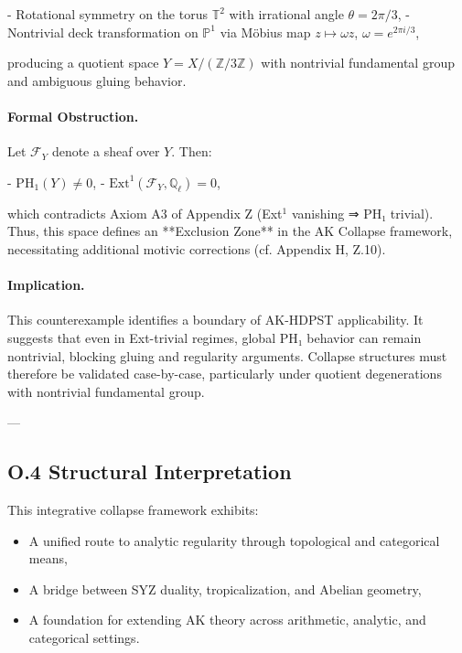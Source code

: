 \documentclass[11pt]{article}
\begin{document}
\begin{axiom}
\begin{axiom}
{{- Rotational symmetry on the torus \( \mathbb{T}^2 \) with irrational angle \( \theta = 2\pi/3 \),
- Nontrivial deck transformation on \( \mathbb{P}^1 \) via Möbius map \( z \mapsto \omega z \), \( \omega = e^{2\pi i/3} \),

producing a quotient space \( Y = X / (\mathbb{Z}/3\mathbb{Z}) \) with nontrivial fundamental group and ambiguous gluing behavior.

\paragraph{Formal Obstruction.}
Let \( \mathcal{F}_Y \) denote a sheaf over \( Y \). Then:

- \( \mathrm{PH}_1(Y) \neq 0 \),
- \( \mathrm{Ext}^1(\mathcal{F}_Y, \mathbb{Q}_\ell) = 0 \),

which contradicts Axiom A3 of Appendix Z (Ext$^1$ vanishing ⇒ PH₁ trivial).  
Thus, this space defines an **Exclusion Zone** in the AK Collapse framework, necessitating additional motivic corrections (cf. Appendix H, Z.10).

\paragraph{Implication.}
This counterexample identifies a boundary of AK-HDPST applicability. It suggests that even in Ext-trivial regimes, global PH₁ behavior can remain nontrivial, blocking gluing and regularity arguments. Collapse structures must therefore be validated case-by-case, particularly under quotient degenerations with nontrivial fundamental group.


---

\subsection*{O.4 Structural Interpretation}

This integrative collapse framework exhibits:

\begin{itemize}
  \item A unified route to analytic regularity through topological and categorical means,
  \item A bridge between SYZ duality, tropicalization, and Abelian geometry,
  \item A foundation for extending AK theory across arithmetic, analytic, and categorical settings.
\end{itemize}

}}
\end{axiom}
\end{axiom}
\end{document}
